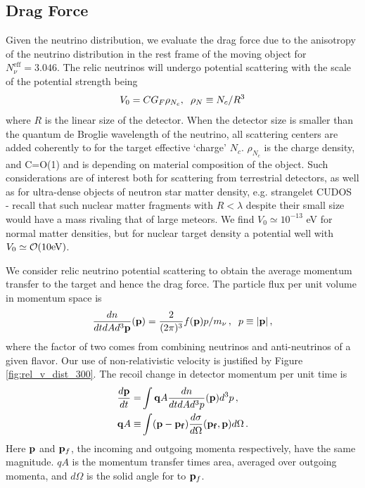 \subsection{Drag Force}
Given the neutrino distribution, we evaluate the drag force due to the anisotropy of the neutrino distribution in the rest frame of the moving object for $N_\nu^{\mathrm{eff}}=3.046$. The relic neutrinos will undergo potential scattering with the scale of the potential strength being
\begin{equation}\label{V0}
V_0=CG_F\rho_{N_c},\hspace{2mm} \rho_N\equiv N_c/R^3
\end{equation}
where $R$ is the linear size of the detector.  When the detector size is smaller than the quantum de Broglie wavelength of the neutrino, all scattering centers are added coherently to for the target effective `charge' $N_c$.  $\rho_{N_c}$ is the charge density, and C=O(1) and is depending on material composition of the object. Such considerations are of interest both for scattering from terrestrial detectors, as well as for ultra-dense objects of neutron star matter density, e.g.   strangelet  CUDOS~\cite{CUDO} - recall that such nuclear matter fragments with $R<\lambda$  despite their small size would have a mass rivaling that of large meteors. We find $V_0\simeq 10^{-13}$ eV for normal matter densities, but for nuclear target density a potential well with $V_0\simeq {\cal O}(10 {\rm eV})$.  

We consider relic neutrino potential scattering to obtain the average momentum transfer to the target and hence the drag force. The particle flux per unit volume in momentum space is
\begin{equation}\label{dn_quantum}
\frac{dn}{dtd Ad^3{\bf p}}({\bf p})=\frac{2}{(2\pi)^3}f({\bf p})p/m_\nu\,,\hspace{2mm} p\equiv |{\bf p}|\,,
\end{equation}
where the factor of two comes from combining neutrinos and anti-neutrinos of a given flavor. Our use of non-relativistic velocity is justified by Figure \ref{fig:rel_v_dist_300}.  The recoil change in detector momentum per unit time is  
\begin{align}
\frac{d{\bf p}}{dt}=& \int  {\bf q}A \frac{dn}{dtdAd^3p}({\bf p})d^3p\,,\\
{\bf q}A\equiv &\int ({\bf p}-{\bf p_f})\frac{d\sigma}{ d\Omega}({\bf p_f},{\bf p})d\Omega\,.
\end{align}
Here ${\bf p}$ and ${\bf p}_f$, the incoming and outgoing momenta respectively, have the same magnitude. $qA$ is the momentum transfer times area, averaged over outgoing momenta, and $d\Omega$ is the solid angle for to ${\bf p}_f$.  

